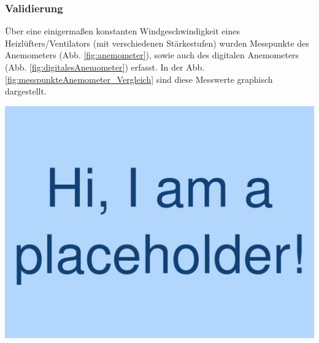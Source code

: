 \subsubsection{Validierung}
Über eine einigermaßen konstanten Windgeschwindigkeit eines Heizlüfters/Ventilators (mit verschiedenen Stärkestufen) wurden Messpunkte des Anemometers (Abb. \ref{fig:anemometer}), sowie auch des digitalen Anemometers (Abb. \ref{fig:digitalesAnemometer}) erfasst. In der Abb. \ref{fig:messpunkteAnemometer_Vergleich} sind diese Messwerte graphisch dargestellt.\\
\begin{minipage}{0.65\textwidth}
\vspace{0.5cm}
\centering
\includegraphics[width=\textwidth]{graphics/placeholder.png}
\label{fig:messpunkteAnemometer_Vergleich}
\end{minipage}
